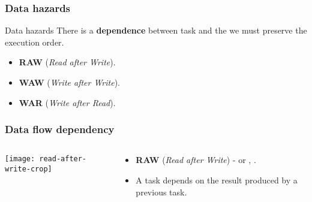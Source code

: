 \begin{frame}
  \frametitle{Data hazards}
  \begin{alertblock}{Data hazards}
  There is a \textbf{dependence} between task and the we must preserve the execution order. 
    \begin{itemize}
    \item \textbf{RAW} (\emph{Read after Write}).
    \item \textbf{WAW} (\emph{Write after Write}).
    \item \textbf{WAR} (\emph{Write after Read}).
    \end{itemize}
  \end{alertblock}
\end{frame}
\begin{frame}
  \frametitle{Data flow dependency}
  \begin{columns}
  \begin{column}{0.4\textwidth}
	\texttt{[image: read-after-write-crop]}
  \end{column}
  \begin{column}{0.6\textwidth}
    \begin{itemize}
    \item \textbf{RAW} (\emph{Read after Write}) - or , .
    \item A task depends on the result produced by a previous task.
    \end{itemize}
  \end{column}
  \end{columns}
\end{frame}
